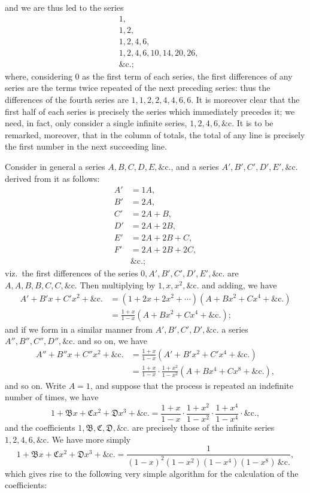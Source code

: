 \documentclass[12pt,a4paper]{article}
\theoremstyle{plain}
\begin{document}
\medskip

and we are thus led to the series
\begin{align*}
&1,\\
&1,2,\\
&1,2,4,6,\\
&1,2,4,6,10,14,20,26,\\
&\&\mathrm{c}.;
\end{align*}
where, considering 0 as the first term of each series, the first differences of any series are the terms twice repeated of the next preceding series: thus the differences of the fourth series are $1,1,2,2,4,4,6,6$. It is moreover clear that the first half of each series is precisely the series which immediately precedes it; we need, in fact, only consider a single infinite series, $1,2,4,6,\&\mathrm{c}$. It is to be remarked, moreover, that in the column of totals, the total of any line is precisely the first number in the next succeeding line.

\medskip

Consider in general a series $A,B,C,D,E,\&\mathrm{c}.$, and a series $A',B',C',D',E',\&\mathrm{c}.$ derived from it as follows:
\begin{align*}
A' &= 1A,\\
B' &= 2A,\\
C' &= 2A+B,\\
D' &= 2A+2B,\\
E' &= 2A+2B+C,\\
F' &= 2A+2B+2C,\\
&\&\mathrm{c}.;
\end{align*}
viz.\ the first differences of the series $0,A',B',C',D',E',\&\mathrm{c}.$ are $A,A,B,B,C,C,\&\mathrm{c}.$ Then multiplying by $1,x,x^2,\&\mathrm{c}.$ and adding, we have
\begin{align*}
A'+B'x+C'x^2+\&\mathrm{c}. &= (1+2x+2x^2+\cdots)(A+Bx^2+Cx^4+\&\mathrm{c}.)\\
&= \frac{1+x}{1-x}(A+Bx^2+Cx^4+\&\mathrm{c}.);
\end{align*}
and if we form in a similar manner from $A',B',C',D',\&\mathrm{c}.$ a series $A'',B'',C'',D'',\&\mathrm{c}.$ and so on, we have
\begin{align*}
A''+B''x+C''x^2+\&\mathrm{c}. &= \frac{1+x}{1-x}(A'+B'x^2+C'x^4+\&\mathrm{c}.)\\
&= \frac{1+x}{1-x}\cdot\frac{1+x^2}{1-x^2}(A+Bx^4+Cx^8+\&\mathrm{c}.),
\end{align*}
and so on. Write $A=1$, and suppose that the process is repeated an indefinite number of times, we have
\[
1+\mathfrak{B}x+\mathfrak{C}x^2+\mathfrak{D}x^3+\&\mathrm{c}.=\frac{1+x}{1-x}\cdot\frac{1+x^2}{1-x^2}\cdot\frac{1+x^4}{1-x^4}\cdot\&\mathrm{c}.,
\]
and the coefficients $1,\mathfrak{B},\mathfrak{C},\mathfrak{D},\&\mathrm{c}.$ are precisely those of the infinite series $1,2,4,6,\&\mathrm{c}.$ We have more simply
\[
1+\mathfrak{B}x+\mathfrak{C}x^2+\mathfrak{D}x^3+\&\mathrm{c}.=\frac{1}{(1-x)^2(1-x^2)(1-x^4)(1-x^8)\,\&\mathrm{c}.},
\]
which gives rise to the following very simple algorithm for the calculation of the coefficients:
\end{document}
